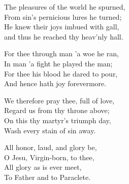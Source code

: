 \begin{multicols}{2}
	The pleasures of the world he spurned,\\
	From sin's pernicious lures he turned;\\
	He knew their joys imbued with gall,\\
	and thus he reached thy heav'nly hall.
	
	For thee through man 'a woe he ran,\\
	In man 'a fight he played the man;\\
	For thee his blood he dared to pour,\\
	And hence hath joy forevermore.
	
	We therefore pray thee, full of love,\\
	Regard us from thy throne above;\\
	On this thy martyr's triumph day,\\
	Wash every stain of sin away.
	
	All honor, laud, and glory be,\\
	O Jesu, Virgin-born, to thee,\\
	All glory as is ever meet,\\
	To Father and to Paraclete.
\end{multicols}